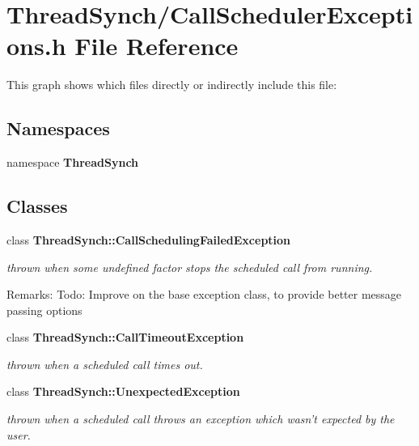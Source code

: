 \section{Thread\-Synch/Call\-Scheduler\-Exceptions.h File Reference}
\label{_call_scheduler_exceptions_8h}


This graph shows which files directly or indirectly include this file:\subsection*{Namespaces}
\begin{CompactItemize}
\item 
namespace {\bf Thread\-Synch}
\end{CompactItemize}
\subsection*{Classes}
\begin{CompactItemize}
\item 
class {\bf Thread\-Synch::Call\-Scheduling\-Failed\-Exception}
\begin{CompactList}\small\item\em thrown when some undefined factor stops the scheduled call from running. \begin{Desc}
\item[Remarks:]Todo: Improve on the base exception class, to provide better message passing options \end{Desc}
\item\end{CompactList}\item 
class {\bf Thread\-Synch::Call\-Timeout\-Exception}
\begin{CompactList}\small\item\em thrown when a scheduled call times out. \item\end{CompactList}\item 
class {\bf Thread\-Synch::Unexpected\-Exception}
\begin{CompactList}\small\item\em thrown when a scheduled call throws an exception which wasn't expected by the user. \item\end{CompactList}\end{CompactItemize}
